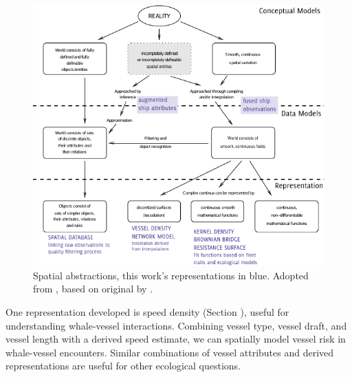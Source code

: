

\begin{figure}
  \centering
  \hspace*{-0.25in}
  \includegraphics[width=155mm]{figures/representation-in-gis-myriad.pdf}
  \caption[Spatial abstractions]{Spatial abstractions, this work's {\color{DBlue} representations in blue}. Adopted from \cite{Bivand2011}, based on original by \cite{burrough1996geographic}.}
  \label{fig:representation-in-gis}
\end{figure}

One representation developed is speed density (Section \cite{ref:ship-density-estimates}), useful for understanding whale-vessel interactions. Combining vessel type, vessel draft, and vessel length with a derived speed estimate, we can spatially model vessel risk in whale-vessel encounters. Similar combinations of vessel attributes and derived representations are useful for other ecological questions.

